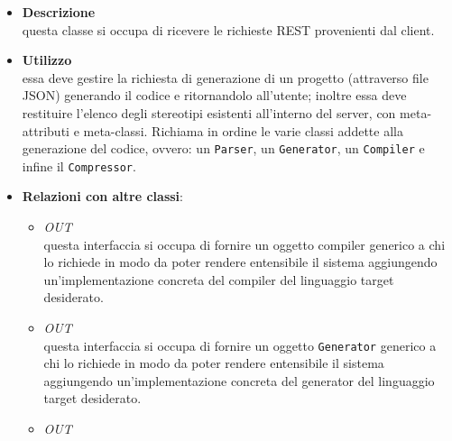 \begin{figure}[h]
\centering
{}
\caption{}
\end{figure}
\FloatBarrier
\begin{itemize}
\item \textbf{Descrizione}\\
questa classe si occupa di ricevere le richieste REST provenienti dal client.
\item \textbf{Utilizzo}\\
essa deve gestire la richiesta di generazione di un progetto (attraverso file JSON) generando il codice e ritornandolo all'utente; inoltre essa deve restituire l'elenco degli stereotipi esistenti all'interno del server, con meta-attributi e meta-classi.
Richiama in ordine le varie classi addette alla generazione del codice, ovvero: un \texttt{Parser}, un \texttt{Generator}, un \texttt{Compiler} e infine il \texttt{Compressor}. 
\item \textbf{Relazioni con altre classi}:
\begin{itemize}
\item \textit{OUT} \hyperref[\nogloxy{swedesigner::server::compiler::Compiler}]{}\\
questa interfaccia si occupa di fornire un oggetto compiler generico a chi lo richiede in modo da poter rendere entensibile il sistema aggiungendo un'implementazione concreta del compiler del linguaggio target desiderato.
\item \textit{OUT} \hyperref[\nogloxy{swedesigner::server::generator::Generator}]{}\\
questa interfaccia si occupa di fornire un oggetto \texttt{Generator} generico a chi lo richiede in modo da poter rendere entensibile il sistema aggiungendo un'implementazione concreta del generator del linguaggio target desiderato.
\item \textit{OUT} \hyperref[\nogloxy{swedesigner::server::parser::Parser}]{}\\

\end{itemize}
\end{itemize}
